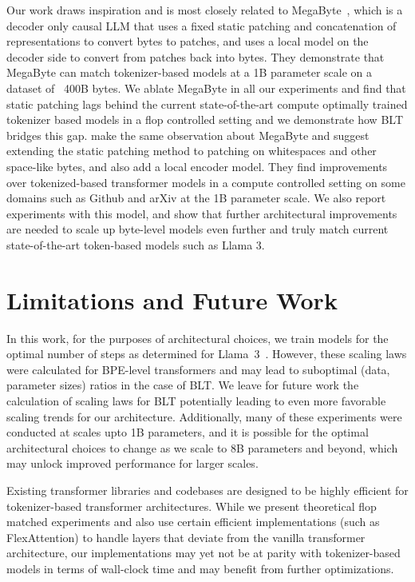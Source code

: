 Our work draws inspiration and is most closely related to MegaByte~\citep{yu2023megabyte}, which is a decoder only causal LLM that uses a fixed static patching and concatenation of representations to convert bytes to patches, and uses a local model on the decoder side to convert from patches back into bytes. They demonstrate that MegaByte can match tokenizer-based models at a 1B parameter scale on a dataset of ~400B bytes. We ablate MegaByte in all our experiments and find that static patching lags behind the current state-of-the-art compute optimally trained tokenizer based models in a flop controlled setting and we demonstrate how {\textsc BLT} bridges this gap. \cite{slagle2024spacebyte} make the same observation about MegaByte and suggest extending the static patching method to patching on whitespaces and other space-like bytes, and also add a local encoder model. They find improvements over tokenized-based transformer models in a compute controlled setting on some domains such as Github and arXiv at the 1B parameter scale. We also report experiments with this model, and show that further architectural improvements are needed to scale up byte-level models even further and truly match current state-of-the-art token-based models such as Llama 3.

\section{Limitations and Future Work}

In this work, for the purposes of architectural choices, we train models for the optimal number of steps as determined for Llama~3~\citep{dubey2024llama}. However, these scaling laws were calculated for BPE-level transformers and may lead to suboptimal (data, parameter sizes) ratios in the case of {\textsc BLT}. We leave for future work the calculation of scaling laws for {\textsc BLT} potentially leading to even more favorable scaling trends for our architecture. Additionally, many of these experiments were conducted at scales upto 1B parameters, and it is possible for the optimal architectural choices to change as we scale to 8B parameters and beyond, which may unlock improved performance for larger scales. 

Existing transformer libraries and codebases are designed to be highly efficient for tokenizer-based transformer architectures. While we present theoretical flop matched experiments and also use certain efficient implementations (such as FlexAttention) to handle layers that deviate from the vanilla transformer architecture, our implementations may yet not be at parity with tokenizer-based models in terms of wall-clock time and may benefit from further optimizations. 

